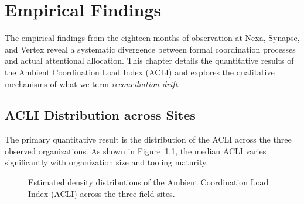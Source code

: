 \chapter{Empirical Findings}
\label{ch:findings}

The empirical findings from the eighteen months of observation at Nexa, Synapse, and Vertex reveal a systematic divergence between formal coordination processes and actual attentional allocation. This chapter details the quantitative results of the Ambient Coordination Load Index (ACLI) and explores the qualitative mechanisms of what we term \emph{reconciliation drift}.

\section{ACLI Distribution across Sites}

The primary quantitative result is the distribution of the ACLI across the three observed organizations. As shown in Figure~\ref{fig:acli_dist}, the median ACLI varies significantly with organization size and tooling maturity.

\begin{figure}[htbp]
\centering
{}
\caption{Estimated density distributions of the Ambient Coordination Load Index (ACLI) across the three field sites.}
\label{fig:acli_dist}
\end{figure}

